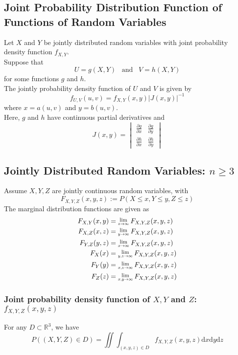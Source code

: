 \documentclass[12pt]{article}
\newcommand{\diff}{\mathrm{d}}
\newcommand{\Lim}[1]{\raisebox{0.5ex}{\scalebox{0.8}{$\displaystyle \lim_{#1}\;$}}}
\theoremstyle{definition}
\begin{document}
\subsection{Joint Probability Distribution Function of Functions of Random Variables}
Let $X$ and $Y$ be jointly distributed random variables with joint probability density function $f_{X,Y}$.\\
Suppose that
\[
U=g(X,Y)\;\;\;\text{and}\;\;\;V=h(X,Y)
\]
for some functions $g$ and $h$.\\
The jointly probability density function of $U$ and $V$ is given by
\[
f_{U,V}(u,v)=f_{X,Y}(x,y)|J(x,y)|^{-1}
\]
where $x=a(u,v)$ and $y = b(u,v)$.\\
Here, $g$ and $h$ have continuous partial derivatives and
\[
J(x,y)=\begin{vmatrix}
\frac{\partial g}{\partial x}&\frac{\partial g}{\partial y}\\
\frac{\partial h}{\partial x}&\frac{\partial h}{\partial y}
\end{vmatrix}
\]
\subsection{Jointly Distributed Random Variables: $n\geq 3$}
Assume $X, Y, Z$ are jointly continuous random variables, with
\[
F_{X,Y,Z}(x,y,z):=P(X\leq x, Y\leq y, Z\leq z)
\]
The marginal distribution functions are given as
\[
\begin{aligned}
F_{X,Y}(x,y)&=\Lim{z\to \infty}F_{X,Y,Z}(x,y,z)\\
F_{X,Z}(x,z)&=\Lim{y\to \infty}F_{X,Y,Z}(x,y,z)\\
F_{Y,Z}(y,z)&=\Lim{x\to \infty}F_{X,Y,Z}(x,y,z)\\
F_{X}(x)&=\Lim{y,z\to \infty}F_{X,Y,Z}(x,y,z)\\
F_{Y}(y)&=\Lim{x,z\to \infty}F_{X,Y,Z}(x,y,z)\\
F_{Z}(z)&=\Lim{x,y\to \infty}F_{X,Y,Z}(x,y,z)
\end{aligned}
\]
\subsubsection{Joint probability density function of $X,Y$ and $Z$:$f_{X,Y,Z}(x,y,z)$}
For any $D\subset \mathbb{R}^3$, we have
\[
P((X,Y,Z)\in D)=\iint\int_{(x,y,z)\in D}f_{X,Y,Z}(x,y,z)\diff x\diff y\diff z
\]
\end{document}
